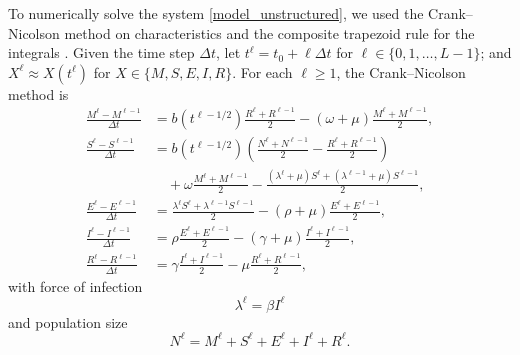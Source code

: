 \documentclass{jpmarticle}
\begin{document}
To numerically solve the system
\eqref{model_unstructured}, we used the Crank--Nicolson
method on characteristics and the composite trapezoid rule for the
integrals \autocite{milner_1992}.  Given the time step $\Delta t$,
let $t^{\ell} = t_0 + \ell \Delta t$
for $\ell \in \{0, 1, \ldots, L - 1\}$;
and $X^{\ell} \approx X(t^{\ell})$
for $X \in \{M, S, E, I, R\}$.
For each $\ell \geq 1$, the Crank--Nicolson method is
\begin{equation}
  \begin{split}
    \frac{M^{\ell} - M^{\ell - 1}}{\Delta t}
    &=
    b(t^{\ell - 1 / 2})
    \frac{R^{\ell} + R^{\ell - 1}}{2}
    - (\omega + \mu)
    \frac{M^{\ell} + M^{\ell - 1}}{2},
    \\
    \frac{S^{\ell} - S^{\ell - 1}}{\Delta t}
    &=
    b(t^{\ell - 1 / 2})
    \left(\frac{N^{\ell} + N^{\ell - 1}}{2}
      - \frac{R^{\ell} + R^{\ell - 1}}{2}\right)
    \\ & \quad {}
    + \omega \frac{M^{\ell} + M^{\ell - 1}}{2}
    - \frac{(\lambda^{\ell} + \mu) S^{\ell}
      + (\lambda^{\ell - 1} + \mu) S^{\ell - 1}}{2},
    \\
    \frac{E^{\ell} - E^{\ell - 1}}{\Delta t}
    &=
    \frac{\lambda^{\ell} S^{\ell} + \lambda^{\ell - 1} S^{\ell- 1}}{2}
    - (\rho + \mu)
    \frac{E^{\ell} + E^{\ell - 1}}{2},
    \\
    \frac{I^{\ell} - I^{\ell - 1}}{\Delta t}
    &=
    \rho \frac{E^{\ell} + E^{\ell - 1}}{2}
    - (\gamma + \mu) \frac{I^{\ell} + I^{\ell - 1}}{2},
    \\
    \frac{R^{\ell} - R^{\ell - 1}}{\Delta t}
    &=
    \gamma \frac{I^{\ell} + I^{\ell - 1}}{2}
    - \mu \frac{R^{\ell} + R^{\ell - 1}}{2},
  \end{split}
\end{equation}
with force of infection
\begin{equation}
  \lambda^{\ell} = \beta I^{\ell}
\end{equation}
and population size
\begin{equation}
  N^{\ell} = M^{\ell} + S^{\ell} + E^{\ell} + I^{\ell} + R^{\ell}.
\end{equation}
\end{document}
